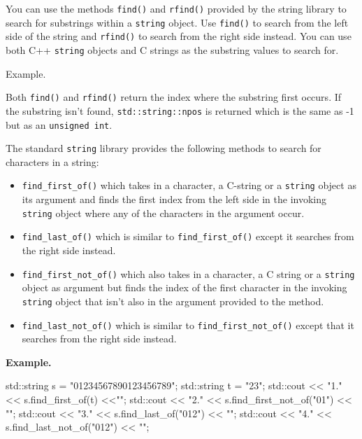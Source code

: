 \newpage{}

You can use the methods \texttt{find()} and \texttt{rfind()} provided by the
string library to search for substrings within a \texttt{string} object.
Use \texttt{find()} to search from the left side of the string and
\texttt{rfind()} to search from the right side instead. You can use both
C++ \texttt{string} objects and C strings as the substring values to
search for.

Example.


Both \texttt{find()} and \texttt{rfind()} return the index where the
substring first occurs. If the substring isn't found,
\texttt{std::string::npos} is returned which is the same as -1 but as an
\texttt{unsigned int}.

\newpage{}

The standard \texttt{string} library provides the following methods to
search for characters in a string:

\begin{itemize}
\item
  \verb!find_first_of()! which takes in a character, a C-string or a
  \texttt{string} object as its argument and finds the first index from
  the left side in the invoking \texttt{string} object where any of the
  characters in the argument occur.
\item
  \verb!find_last_of()! which is similar to \verb!find_first_of()!
  except it searches from the right side instead.
\item
  \verb!find_first_not_of()! which also takes in a character, a C
  string or a \texttt{string} object as argument but finds the index of
  the first character in the invoking \texttt{string} object that
  isn't also in the argument provided to the method.
\item
  \verb!find_last_not_of()! which is similar to
  \verb!find_first_not_of()! except that it searches from the right side instead.
\end{itemize}

\textbf{Example.}

\begin{console}
std::string s = "01234567890123456789";
std::string t = "23";
std::cout << "1." << s.find_first_of(t) <<"\n";
std::cout << "2." << s.find_first_not_of("01") << "\n";
std::cout << "3." << s.find_last_of("012") << "\n";
std::cout << "4." << s.find_last_not_of("012") << "\n";
\end{console}

